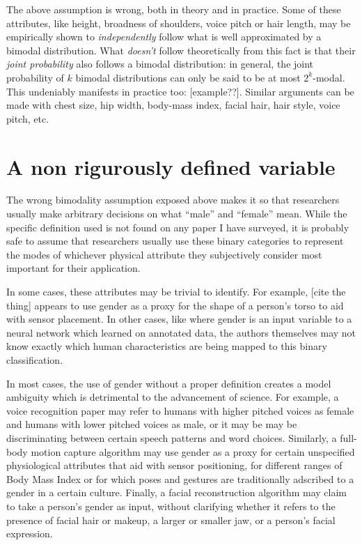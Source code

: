 \documentclass[acmtog,nonacm,review,balance=false]{acmart}
\begin{document}
The above assumption is wrong, both in theory and in practice. Some of these
attributes, like height, broadness of shoulders, voice pitch or hair length, may
be empirically shown to \emph{independently} follow what is well approximated by
a bimodal distribution. What \emph{doesn't} follow theoretically from this fact
is that their \emph{joint probability} also follows a bimodal distribution: in
general, the joint probability of $k$ bimodal distributions can only be said to
be at most $2^k$-modal. This undeniably manifests in practice too: [example??]. Similar arguments can
be made with chest size, hip width, body-mass index, facial hair, hair style,
voice pitch, etc.

\section{A non rigurously defined variable}

The wrong bimodality assumption exposed above makes it so that researchers
usually make arbitrary decisions on what ``male'' and ``female'' mean. While the
specific definition used is not found on any paper I have surveyed, it is
probably safe to assume that researchers usually use these binary categories to
represent the modes of whichever physical attribute they subjectively consider
most important for their application.

In some cases, these attributes may be trivial to identify. For example, [cite
the thing] appears to use gender as a proxy for the shape of a person's torso to
aid with sensor placement. In other cases, like where gender is an input
variable to a neural network which learned on annotated data, the authors
themselves may not know exactly which human characteristics are being mapped to
this binary classification.

In most cases, the use of gender without a proper definition creates a model
ambiguity which is detrimental to the advancement of science. For example, a
voice recognition paper may refer to humans with higher pitched voices as female
and humans with lower pitched voices as male, or it may be may be discriminating
between certain speech patterns and word choices. Similarly, a full-body motion
capture algorithm may use gender as a proxy for certain unspecified
physiological attributes that aid with sensor positioning, for different ranges
of Body Mass Index or for which poses and gestures are traditionally adscribed
to a gender in a certain culture. Finally, a facial reconstruction algorithm may
claim to take a person's gender as input, without clarifying whether it refers
to the presence of facial hair or makeup, a larger or smaller jaw, or a person's
facial expression.
\end{document}
